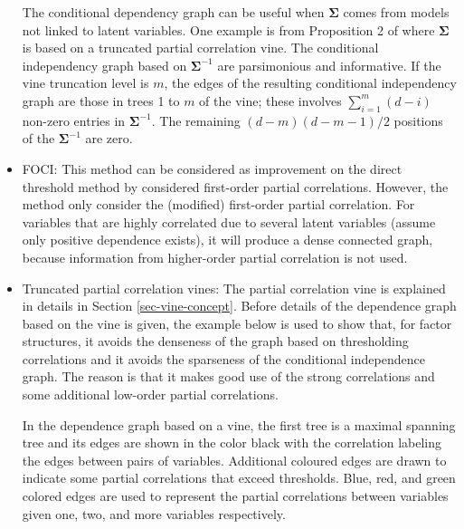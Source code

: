 \documentclass[a4paper]{article}
\def\sigb{{\boldsymbol{\Sigma}}}
\begin{document}
\begin{itemize}
  The conditional dependency graph can be useful when $\sigb$ comes
  from models not linked to latent variables.  One example is from
  Proposition 2 of \cite{joe2018parsimonious} where $\sigb$ is based
  on a truncated partial correlation vine.  The conditional
  independency graph based on $\sigb^{-1}$ are parsimonious and
  informative.  If the vine truncation level is $m$, the edges of the
  resulting conditional independency graph are those in trees 1 to $m$
  of the vine; these involves $\sum_{i=1}^m (d-i)$ non-zero entries in
  $\sigb^{-1}$.  The remaining $(d-m)(d-m-1)/2$ positions of the
  $\sigb^{-1}$ are zero.
   
   
    \item FOCI: This method can be considered as improvement on the direct threshold method by
    considered first-order partial correlations. However, the method only consider the (modified) first-order partial correlation. For variables that are highly correlated due to several latent variables (assume only positive dependence exists), it will produce a dense connected graph, because information from higher-order partial correlation is not used.

\item Truncated partial correlation vines: 
The partial correlation vine is explained in details in Section \ref{sec-vine-concept}. Before details of the dependence graph based on the vine is given, the example
below is used to show that, for factor structures, it avoids the denseness of the graph based
on thresholding correlations and it avoids the sparseness of the conditional independence
graph. The reason is that it makes good use of the strong correlations and some additional
low-order partial correlations. 

In the dependence graph based on a vine, the first tree is a maximal spanning tree and its
edges are shown in the color black with the correlation labeling the edges between pairs of
variables. Additional coloured edges are drawn to indicate some partial correlations that exceed thresholds. Blue, red, and green colored edges are used to represent the partial
correlations between variables given one, two, and more variables respectively.

\end{itemize}
\end{document}
